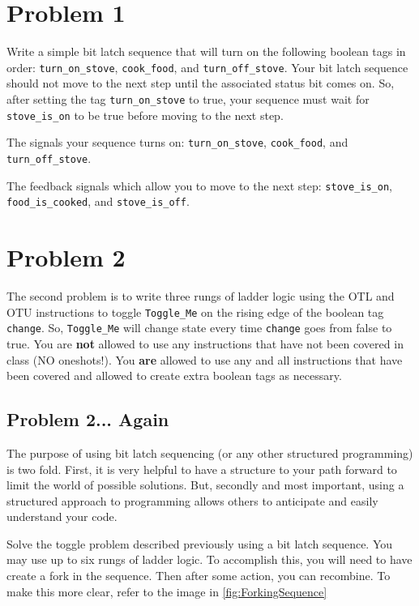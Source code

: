 \section{Problem 1}

Write a simple bit latch sequence that will turn on the following boolean tags in order: \verb|turn_on_stove|, \verb|cook_food|, and \verb|turn_off_stove|. Your bit latch sequence should not move to the next step until the associated status bit comes on. So, after setting the tag \verb|turn_on_stove| to true, your sequence must wait for \verb|stove_is_on| to be true before moving to the next step. 

The signals your sequence turns on:
\verb|turn_on_stove|, \verb|cook_food|, and \verb|turn_off_stove|.

The feedback signals which allow you to move to the next step:
\verb|stove_is_on|, \verb|food_is_cooked|, and \verb|stove_is_off|.



\section{Problem 2}

The second problem is to write three rungs of ladder logic using the OTL and OTU instructions to toggle \verb|Toggle_Me| on the rising edge of the boolean tag \verb|change|. So, \verb|Toggle_Me| will change state every time \verb|change| goes from false to true. You are \textbf{not} allowed to use any instructions that have not been covered in class (NO oneshots!). You \textbf{are} allowed to use any and all instructions that have been covered and allowed to create extra boolean tags as necessary.


\subsection{Problem 2... Again}

The purpose of using bit latch sequencing (or any other structured programming) is two fold. First, it is very helpful to have a structure to your path forward to limit the world of possible solutions. But, secondly and most important, using a structured approach to programming allows others to anticipate and easily understand your code.

Solve the toggle problem described previously using a bit latch sequence. You may use up to six rungs of ladder logic. To accomplish this, you will need to have create a fork in the sequence. Then after some action, you can recombine. To make this more clear, refer to the image in \ref{fig:ForkingSequence}


